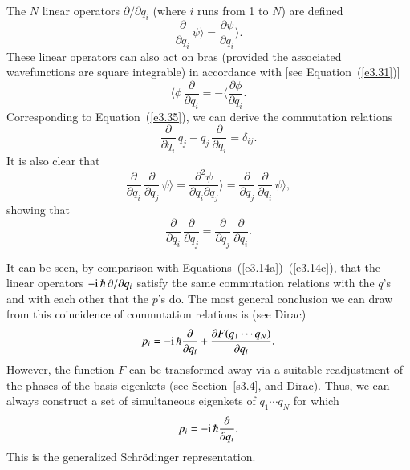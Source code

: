 The $N$ linear operators $\partial/\partial q_i$ (where $i$ runs from 1 to $N$)
are defined
\begin{equation}\label{e3.57}
\frac{\partial}{\partial q_i} \,\psi\rangle =\frac{\partial\psi}{\partial q_i}
\rangle.
\end{equation}
These linear operators can also act on bras (provided the associated wavefunctions
are square integrable) in accordance with [see Equation~(\ref{e3.31})]
\begin{equation}
\langle \phi\, \frac{\partial }{\partial q_i} = -\langle \frac{\partial \phi}
{\partial q_i}.
\end{equation}
Corresponding to Equation~(\ref{e3.35}), we can derive the commutation relations
\begin{equation}
\frac{\partial}{\partial q_i}\, q_j - q_j \,\frac{\partial}{\partial q_i} = \delta_{ij}.
\end{equation}
It is also clear that
\begin{equation}
\frac{\partial}{\partial q_i}\,\frac{\partial}{\partial q_j}\, \psi\rangle
= \frac{\partial^2\psi}{\partial q_i \partial q_j} \rangle = \frac{\partial }{\partial
q_j} \,\frac{\partial }{\partial q_i}\, \psi\rangle,
\end{equation}
showing that
\begin{equation}
\frac{\partial}{\partial q_i}\,\frac{\partial}{\partial q_j} = 
\frac{\partial }{\partial q_j}\,
\frac{\partial }{\partial q_i}.
\end{equation}

It can be seen, by comparison with Equations~(\ref{e3.14a})--(\ref{e3.14c}), that the linear operators
$-{\rm i}\,\hbar\, \partial/\partial q_i$ satisfy the same commutation relations
with the $q$'s
and with each other that the $p$'s do. The most general conclusion
we can draw from this coincidence of commutation relations is (see Dirac)
\begin{equation}
p_i = -{\rm i} \,\hbar \frac{\partial}{\partial q_i} +
\frac{\partial  F(q_1\cdots q_N) }{\partial q_i}.
\end{equation}
However, the function $F$
 can be transformed away via  a suitable readjustment of the phases
of the basis eigenkets (see Section~\ref{s3.4}, and Dirac). Thus, we can always construct
a set of simultaneous eigenkets of $q_1\cdots q_N$ for  which
\begin{equation}\label{e3.63}
p_i = -{\rm i}\,\hbar \frac{\partial}{\partial q_i}.
\end{equation}
This is the generalized Schr\"{o}dinger representation. 

